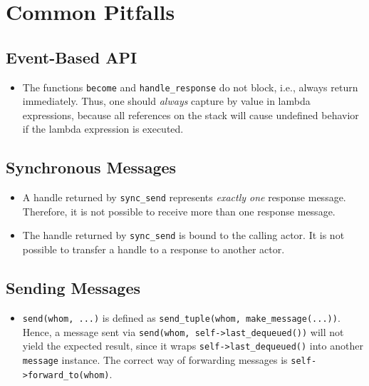 \section{Common Pitfalls}
\label{Sec::Pitfalls}

\subsection{Event-Based API}

\begin{itemize}
\item The functions \lstinline^become^ and \lstinline^handle_response^ do not block, i.e., always return immediately.
Thus, one should \textit{always} capture by value in lambda expressions, because all references on the stack will cause undefined behavior if the lambda expression is executed.
\end{itemize}

\subsection{Synchronous Messages}

\begin{itemize}

\item
A handle returned by \lstinline^sync_send^ represents \emph{exactly one} response message.
Therefore, it is not possible to receive more than one response message.

\item
The handle returned by \lstinline^sync_send^ is bound to the calling actor.
It is not possible to transfer a handle to a response to another actor.

\end{itemize}

\subsection{Sending Messages}

\begin{itemize}

\item
\lstinline^send(whom, ...)^ is defined as \lstinline^send_tuple(whom, make_message(...))^.
Hence, a message sent via \lstinline^send(whom, self->last_dequeued())^ will not yield the expected result, since it wraps \lstinline^self->last_dequeued()^ into another \lstinline^message^ instance.
The correct way of forwarding messages is \lstinline^self->forward_to(whom)^.

\end{itemize}

